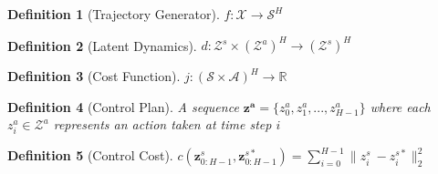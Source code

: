 \documentclass{article}
\newtheorem{definition}{Definition}
\begin{document}
\begin{definition}[Trajectory Generator]
    $f: \mathcal{X} \rightarrow \mathcal{S}^H$
\end{definition}
\begin{definition}[Latent Dynamics]
    $d: \mathcal{Z}^s \times \left(\mathcal{Z}^a\right)^H \rightarrow (\mathcal{Z}^s)^H$
\end{definition}
\begin{definition}[Cost Function]
    $j: (\mathcal{S} \times \mathcal{A})^H \rightarrow \mathbb{R}$
\end{definition}
\begin{definition}[Control Plan]
    A sequence $\mathbf{z^a} = \{z^a_0, z^a_1, ..., z^a_{H-1}\}$ where each $z^a_i \in \mathcal{Z}^a$ represents an action taken at time step $i$
\end{definition}
\begin{definition}[Control Cost]
    $c(\mathbf{z}_{0:H-1}^s, \mathbf{z}_{0:H-1}^{s*}) = \sum\limits_{i=0}^{H-1} \| z^s_i\ - z^{s*}_i \|_2^2$
\end{definition}
\end{document}
